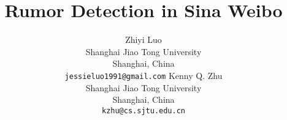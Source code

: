 \documentclass[11pt,letterpaper]{article}
\begin{document}
\title{Rumor Detection in Sina Weibo
}

\author{Zhiyi Luo\\
	    Shanghai Jiao Tong University\\
		 Shanghai, China\\
	    {\tt jessieluo1991@gmail.com}
	  \And
	Kenny Q. Zhu\\
  	Shanghai Jiao Tong University\\
  	Shanghai, China\\
  {\tt kzhu@cs.sjtu.edu.cn}}

\maketitle
\cite{WuLWZ12}
%
%
%
%
%
%

%

\end{document}
